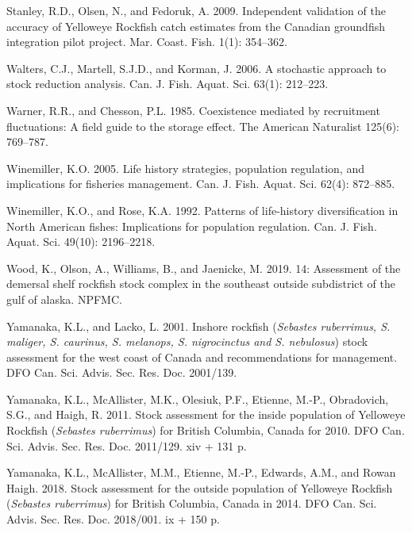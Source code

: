 \documentclass[11pt]{book}
\begin{document}
\leavevmode\hypertarget{ref-stanley2009}{}%
Stanley, R.D., Olsen, N., and Fedoruk, A. 2009. Independent validation of the accuracy of Yelloweye Rockfish catch estimates from the Canadian groundfish integration pilot project. Mar. Coast. Fish. 1(1): 354--362.

\leavevmode\hypertarget{ref-walters2006}{}%
Walters, C.J., Martell, S.J.D., and Korman, J. 2006. A stochastic approach to stock reduction analysis. Can. J. Fish. Aquat. Sci. 63(1): 212--223.

\leavevmode\hypertarget{ref-warner1985}{}%
Warner, R.R., and Chesson, P.L. 1985. Coexistence mediated by recruitment fluctuations: A field guide to the storage effect. The American Naturalist 125(6): 769--787.

\leavevmode\hypertarget{ref-winemiller2005}{}%
Winemiller, K.O. 2005. Life history strategies, population regulation, and implications for fisheries management. Can. J. Fish. Aquat. Sci. 62(4): 872--885.

\leavevmode\hypertarget{ref-winemiller1992}{}%
Winemiller, K.O., and Rose, K.A. 1992. Patterns of life-history diversification in North American fishes: Implications for population regulation. Can. J. Fish. Aquat. Sci. 49(10): 2196--2218.

\leavevmode\hypertarget{ref-wood2019}{}%
Wood, K., Olson, A., Williams, B., and Jaenicke, M. 2019. 14: Assessment of the demersal shelf rockfish stock complex in the southeast outside subdistrict of the gulf of alaska. NPFMC.

\leavevmode\hypertarget{ref-yamanaka2001}{}%
Yamanaka, K.L., and Lacko, L. 2001. Inshore rockfish (\emph{Sebastes ruberrimus, S. maliger, S. caurinus, S. melanops, S. nigrocinctus and S. nebulosus}) stock assessment for the west coast of Canada and recommendations for management. DFO Can. Sci. Advis. Sec. Res. Doc. 2001/139.

\leavevmode\hypertarget{ref-yamanaka2011}{}%
Yamanaka, K.L., McAllister, M.K., Olesiuk, P.F., Etienne, M.-P., Obradovich, S.G., and Haigh, R. 2011. Stock assessment for the inside population of Yelloweye Rockfish (\emph{Sebastes ruberrimus}) for British Columbia, Canada for 2010. DFO Can. Sci. Advis. Sec. Res. Doc. 2011/129. xiv + 131 p.

\leavevmode\hypertarget{ref-yamanaka2018yelloweyeoutside}{}%
Yamanaka, K.L., McAllister, M.M., Etienne, M.-P., Edwards, A.M., and Rowan Haigh. 2018. Stock assessment for the outside population of Yelloweye Rockfish (\emph{Sebastes ruberrimus}) for British Columbia, Canada in 2014. DFO Can. Sci. Advis. Sec. Res. Doc. 2018/001. ix + 150 p.
\end{document}
